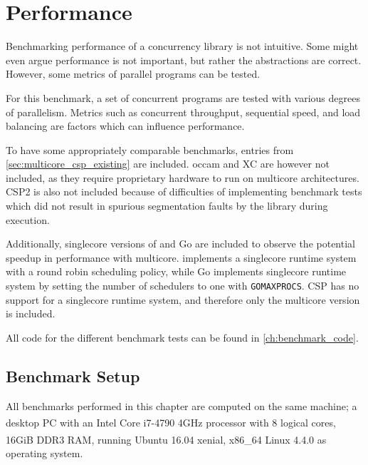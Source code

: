 
\chapter{Performance}
\label{ch:performance}


Benchmarking performance of a concurrency library is not intuitive. Some might even argue performance is not important, but rather the abstractions are correct. However, some metrics of parallel programs can be tested.

For this benchmark, a set of concurrent programs are tested with various degrees of parallelism. Metrics such as concurrent throughput, sequential speed, and load balancing are factors which can influence performance.

To have some appropriately comparable benchmarks, entries from \cref{sec:multicore_csp_existing} are included. occam and XC are however not included, as they require proprietary hardware to run on multicore architectures. \Cpp{}CSP2 is also not included because of difficulties of implementing benchmark tests which did not result in spurious segmentation faults by the library during execution.

Additionally, singlecore versions of \Proxc{} and Go are included to observe the potential speedup in performance with multicore. \Proxc{} implements a singlecore runtime system with a round robin scheduling policy, while Go implements singlecore runtime system by setting the number of schedulers to one with \texttt{GOMAXPROCS}. \Cpp{}CSP has no support for a singlecore runtime system, and therefore only the multicore version is included.

All code for the different benchmark tests can be found in \cref{ch:benchmark_code}.


\section{Benchmark Setup}
\label{sec:benchmark_setup}


All benchmarks performed in this chapter are computed on the same machine; a desktop PC with an Intel\textsuperscript{\textregistered} Core\textsuperscript{\texttrademark} i7-4790 4GHz processor with 8 logical cores, 16GiB DDR3 RAM, running Ubuntu\textsuperscript{\textregistered} 16.04 xenial, x86\_64 Linux\textsuperscript{\textregistered} 4.4.0 as operating system.


